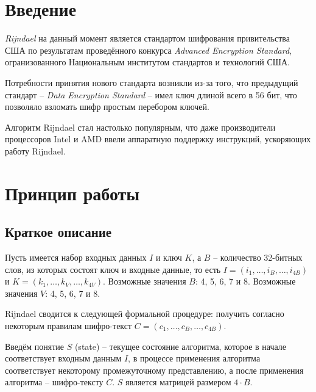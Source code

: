 \section{Введение}

    \textit{Rijndael} на данный момент является стандартом шифрования привительства США по
    результатам проведённого конкурса \textit{Advanced Encryption Standard}, огранизованного
    Национальным институтом стандартов и технологий США.

    Потребности принятия нового стандарта возникли из-за того, что предыдущий стандарт --
    \textit{Data Encryption Standard} -- имел ключ длиной всего в 56 бит, что позволяло взломать
    шифр простым перебором ключей.

    Алгоритм Rijndael стал настолько популярным, что даже производители процессоров Intel и AMD
    ввели аппаратную поддержку инструкций, ускоряющих работу Rijndael.

\section{Принцип работы}
\subsection{Краткое описание}

    Пусть имеется набор входных данных $I$ и ключ $K$, а $B$ -- количество 32-битных слов, из которых
    состоят ключ и входные данные, то есть $I = (i_1, \dots, i_{B}, \dots, i_{4B})$ и
    $K = (k_1, \dots, k_{V}, \dots, k_{4V})$.
    Возможные значения $B$: 4, 5, 6, 7 и 8. Возможные значения $V$: 4, 5, 6, 7 и 8.

    Rijndael сводится к следующей формальной процедуре: получить согласно некоторым правилам
    шифро-текст $C = (c_1, \dots, c_{B}, \dots, c_{4B})$.

    Введём понятие $S$ (state) -- текущее состояние алгоритма, которое в начале соответствует входным данным $I$,
    в процессе применения алгоритма соответствует некоторому промежуточному представлению,
    а после применения алгоритма -- шифро-тексту $C$. $S$ является матрицей размером $4 \cdot B$.

